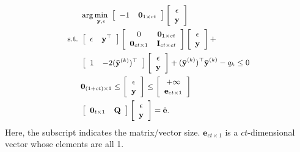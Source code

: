 \documentclass[10pt,journal,compsoc]{IEEEtran}
\begin{document}
\begin{equation}
\label{eq32}
\small{
\begin{split}
          & \arg \min_{\mathbf{y}, \epsilon}~
\left[\begin{array}{c c}
-1 & \mathbf{0}_{1\times ct}
\end{array}\right]
\left[\begin{array}{c}
\epsilon \\
\mathbf{y}
\end{array}\right] \\
\rm{s.t.~}
& \left[\begin{array}{cc}
\epsilon & \mathbf{y}^\top
\end{array}\right]
\left[\begin{array}{cc}
{0}&\mathbf{0}_{1\times ct}\\
\mathbf{0}_{ct\times 1}&\mathbf{I}_{ct\times ct}
\end{array}\right]
\left[\begin{array}{c}
\epsilon \\ \mathbf{y}
\end{array}\right]+\\
& \left[\begin{array}{cc}
1 & -2(\bar{\mathbf{y}}^{(k)})^\top
\end{array}\right]
\left[\begin{array}{c}
\epsilon \\ \mathbf{y}
\end{array}\right]
+ (\bar{\mathbf{y}}^{(k)})^\top \bar{\mathbf{y}}^{(k)}-q_k \le 0\\
& \mathbf{0}_{(1+ct)\times 1} \leq
\left[\begin{array}{c}
\epsilon \\
\mathbf{y}
\end{array}\right]
\leq
\left[\begin{array}{c}
+\infty \\
\mathbf{e}_{ct\times 1}
\end{array}\right] \\
&
\left[\begin{array}{c c}
\mathbf{0}_{t\times1} & \mathbf{Q}
\end{array}\right]
\left[\begin{array}{c}
\epsilon \\
\mathbf{y}
\end{array}\right] = \hat{\mathbf{e}}.
\end{split}}
\end{equation}
Here, the subscript indicates the matrix/vector size. $\mathbf{e}_{ct\times 1}$ is a $ct$-dimensional vector whose elements are all 1.
\end{document}
